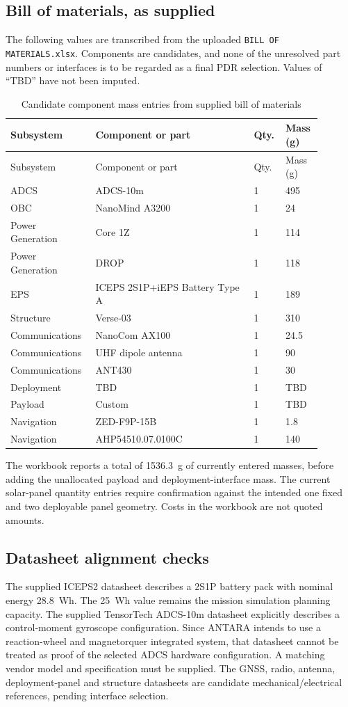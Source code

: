 \subsection{Bill of materials, as supplied}\label{sec:bom-from-upload}
The following values are transcribed from the uploaded \texttt{BILL OF MATERIALS.xlsx}. Components are candidates, and none of the unresolved part numbers or interfaces is to be regarded as a final PDR selection. Values of ``TBD'' have not been imputed.
\begin{longtable}{p{0.23\linewidth}p{0.48\linewidth}p{0.08\linewidth}p{0.10\linewidth}}
\caption{Candidate component mass entries from supplied bill of materials}\label{tab:bom-upload}\\
\toprule Subsystem & Component or part & Qty. & Mass (g) \\\midrule\endfirsthead
\toprule Subsystem & Component or part & Qty. & Mass (g) \\\midrule\endhead
ADCS & ADCS-10m  & 1 & 495 \\
OBC & NanoMind A3200 & 1 & 24 \\
Power Generation & Core 1Z & 1 & 114 \\
Power Generation & DROP & 1 & 118 \\
EPS & ICEPS 2S1P+iEPS Battery Type A & 1 & 189 \\
Structure & Verse-03 & 1 & 310 \\
Communications & NanoCom AX100 & 1 & 24.5 \\
Communications & UHF dipole antenna & 1 & 90 \\
Communications & ANT430 & 1 & 30 \\
Deployment & TBD & 1 & TBD \\
Payload & Custom & 1 & TBD \\
Navigation & ZED-F9P-15B & 1 & 1.8 \\
Navigation & AHP54510.07.0100C & 1 & 140 \\
\bottomrule\end{longtable}
The workbook reports a total of 1536.3~g of currently entered masses, before adding the unallocated payload and deployment-interface mass. The current solar-panel quantity entries require confirmation against the intended one fixed and two deployable panel geometry. Costs in the workbook are not quoted amounts.

\subsection{Datasheet alignment checks}\label{sec:databook-check}
The supplied ICEPS2 datasheet describes a 2S1P battery pack with nominal energy 28.8~Wh. The 25~Wh value remains the mission simulation planning capacity. The supplied TensorTech ADCS-10m datasheet explicitly describes a control-moment gyroscope configuration. Since ANTARA intends to use a reaction-wheel and magnetorquer integrated system, that datasheet cannot be treated as proof of the selected ADCS hardware configuration. A matching vendor model and specification must be supplied. The GNSS, radio, antenna, deployment-panel and structure datasheets are candidate mechanical/electrical references, pending interface selection.

